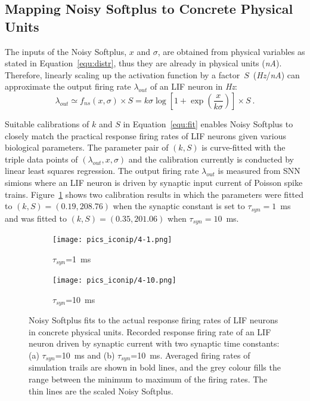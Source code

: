 \documentclass{article}
\begin{document}
\subsection{Mapping Noisy Softplus to Concrete Physical Units}
\label{sec:af_model}
The inputs of the Noisy Softplus, $x$ and $\sigma$, are obtained from physical variables as stated in Equation~\ref{equ:distr}, thus they are already in physical units (\textit{nA}).
Therefore, linearly scaling up the activation function by a factor~$S$~(\textit{Hz}/\textit{nA}) can approximate the output firing rate $\lambda_{out}$ of an LIF neuron in \textit{Hz}:
\begin{equation}
\lambda_{out} \simeq f_{ns}(x, \sigma) \times S = k \sigma \log [1 + \exp(\frac{x}{k \sigma})] \times S~.
\label{equ:fit}
\end{equation}	


Suitable calibrations of $k$ and $S$ in Equation~\ref{equ:fit} enables Noisy Softplus to closely match the practical response firing rates of LIF neurons given various biological parameters.
The parameter pair of $(k, S)$ is curve-fitted with the triple data points of $(\lambda_{out}, x, \sigma)$ and the calibration currently is conducted by linear least squares regression.
The output firing rate $\lambda_{out}$ is measured from SNN simions where an LIF neuron is driven by synaptic input current of Poisson spike trains.
Figure~\ref{Fig:nsptau1} shows two calibration results in which 
the parameters were fitted to $(k, S)=(0.19,208.76)$ when the synaptic constant is set to $\tau_{syn}=1$~ms and was fitted to $(k, S)=(0.35,201.06)$ when $\tau_{syn}=10$~ms.

\begin{figure}
	\centering
	\begin{subfigure}[t]{0.49\textwidth}
		\texttt{[image: pics\_iconip/4-1.png]}
		\caption{$\tau_{syn}$=1~ms}
	\end{subfigure}
	\begin{subfigure}[t]{0.49\textwidth}
		\texttt{[image: pics\_iconip/4-10.png]}
		\caption{$\tau_{syn}$=10~ms}
	\end{subfigure}
	\caption{Noisy Softplus fits to the actual response firing rates of LIF neurons in concrete physical units.
	Recorded response firing rate of an LIF neuron driven by synaptic current with two synaptic time constants: (a) $\tau_{syn}$=10~ms and (b) $\tau_{syn}$=10~ms. Averaged firing rates of simulation trails are shown in bold lines, and the grey colour fills the range between the minimum to maximum of the firing rates. The thin lines are the scaled Noisy Softplus.}
	\label{Fig:nsptau1}
\end{figure}
\end{document}
